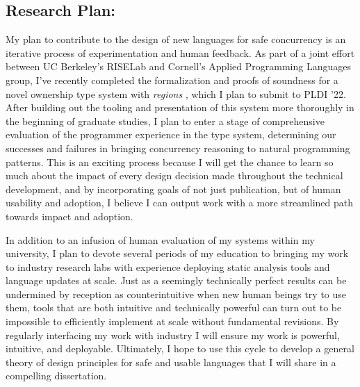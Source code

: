 \documentclass{nsf-grfp}
\begin{document}
\subsection*{Research Plan:} My plan to contribute to the design of new languages for safe concurrency is an iterative process of experimentation and human feedback. As part of a joint effort between UC Berkeley's RISELab and Cornell's Applied Programming Languages group, I've recently completed the formalization and proofs of soundness for a novel ownership type system with \textit{regions} \cite{regions}, which I plan to submit to PLDI '22. After building out the tooling and presentation of this system more thoroughly in the beginning of graduate studies, I plan to enter a stage of comprehensive evaluation of the programmer experience in the type system, determining our successes and failures in bringing concurrency reasoning to natural programming patterns. This is an exciting process because I will get the chance to learn so much about the impact of every design decision made throughout the technical development, and by incorporating goals of not just publication, but of human usability and adoption, I believe I can output work with a more streamlined path towards impact and adoption.

In addition to an infusion of human evaluation of my systems within my university, I plan to devote several periods of my education to bringing my work to industry research labs with experience deploying static analysis tools and language updates at scale. Just as a seemingly technically perfect results can be undermined by reception as counterintuitive when new human beings try to use them, tools that are both intuitive and technically powerful can turn out to be impossible to efficiently implement at scale without fundamental revisions. By regularly interfacing my work with industry I will ensure my work is powerful, intuitive, and deployable. Ultimately, I hope to use this cycle to develop a general theory of design principles for safe and usable languages that I will share in a compelling dissertation.

\end{document}
